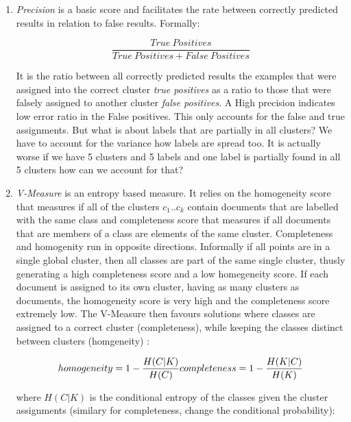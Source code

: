       \begin{enumerate}
        \item \emph{Precision} is a basic score and facilitates the rate between correctly predicted results in relation to false results. Formally:

          \begin{equation}
            \frac{True\:Positives}{True\:Positives + False\:Positives}
          \end{equation}

        It is the ratio between all correctly predicted results the examples that were assigned into the correct cluster \emph{true positives} as a ratio to those that were falsely assigned to another cluster \emph{false positives}. A High precision indicates low error ratio in the False positives. This only accounts for the false and true assignments. But what is about labels that are partially in all clusters? We have to account for the variance how labels are spread too. It is actually worse if we have 5 clusters and 5 labels and one label is partially found in all 5 clusters how can we account for that?

        \item \emph{V-Measure} is an entropy based measure. It relies on the homogeneity score that measures if all of the clusters $c_1..c_k$ contain documents that are labelled with the same class and completeness score that measures if all documents that are members of a class are elements of the same cluster. Completeness and homogenity run in opposite directions. Informally if all points are in a single global cluster, then all classes are part of the same single cluster, thusly generating a high completeness score and a low homegeneity score. If each document is assigned to its own cluster, having as many clusters as documents, the homogeneity score is very high and the completeness score extremely low. The V-Measure then favours solutions where classes are assigned to a correct cluster (completeness), while keeping the classes distinct between clusters (homgeneity) \cite{VMeasure2007}:
          
          \begin{equation}
            homogeneity = 1 - \frac{H(C|K)}{H(C)}\\
            completeness = 1 - \frac{H(K|C)}{H(K)}
          \end{equation}

        where $H(C|K)$ is the conditional entropy of the classes given the cluster assignments (similary for completeness, change the conditional probability):


\end{enumerate}
